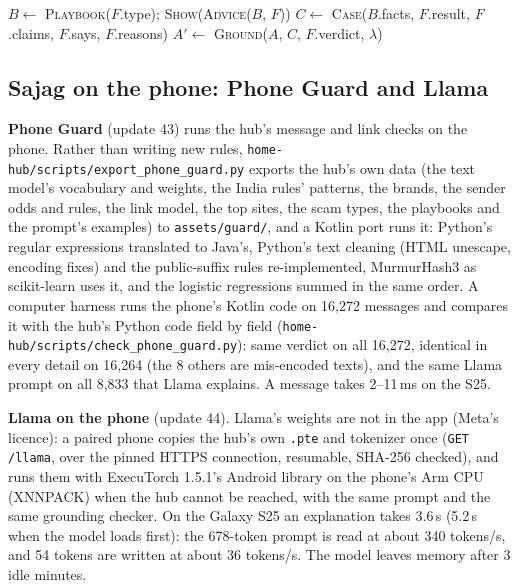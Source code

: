 \documentclass[11pt,a4paper]{article}
\newcommand{\code}[1]{\texttt{#1}}
\begin{document}
\begin{algorithm}[H]
\caption{Explanation of one alert}
$B \leftarrow$ \textsc{Playbook}($F$.type);\; \textsc{Show}(\textsc{Advice}($B$, $F$)) 
$C \leftarrow$ \textsc{Case}($B$.facts, $F$.result, $F$.claims, $F$.says, $F$.reasons) 
$A' \leftarrow$ \textsc{Ground}($A$, $C$, $F$.verdict, $\lambda$) 
\end{algorithm}

\subsection{Sajag on the phone: Phone Guard and Llama}
\label{sec:phone}

\textbf{Phone Guard} (update 43) runs the hub's message and link checks on the phone. Rather than writing new rules,
\code{home-hub/scripts/export\_phone\_guard.py} exports the hub's own data (the text model's vocabulary and weights, the India
rules' patterns, the brands, the sender odds and rules, the link model, the top sites, the scam types, the playbooks and
the prompt's examples) to \code{assets/guard/}, and a Kotlin port runs it: Python's regular expressions translated to
Java's, Python's text cleaning (HTML unescape, encoding fixes) and the public-suffix rules re-implemented, MurmurHash3 as
scikit-learn uses it, and the logistic regressions summed in the same order. A computer harness runs the phone's Kotlin
code on 16,272 messages and compares it with the hub's Python code field by field
(\code{home-hub/scripts/check\_phone\_guard.py}): same verdict on all 16,272, identical in every detail on 16,264 (the 8 others are
mis-encoded texts), and the same Llama prompt on all 8,833 that Llama explains. A message takes 2--11\,ms on the S25.

\textbf{Llama on the phone} (update 44). Llama's weights are not in the app (Meta's licence): a paired phone copies the
hub's own \code{.pte} and tokenizer once (\code{GET /llama}, over the pinned HTTPS connection, resumable, SHA-256
checked), and runs them with ExecuTorch 1.5.1's Android library on the phone's Arm CPU (XNNPACK) when the hub cannot be
reached, with the same prompt and the same grounding checker. On the Galaxy S25 an explanation takes 3.6\,s (5.2\,s when
the model loads first): the 678-token prompt is read at about 340 tokens/s, and 54 tokens are written at about 36
tokens/s. The model leaves memory after 3 idle minutes.
\end{document}
